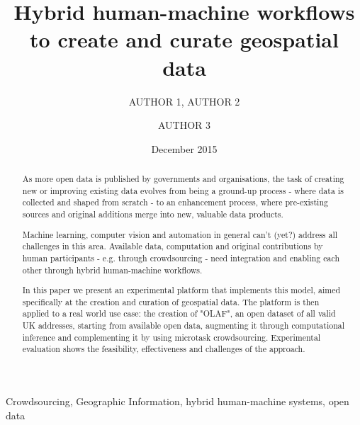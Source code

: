 \documentclass{llncs}
\title{Hybrid human-machine workflows to create and curate geospatial data}
\author{AUTHOR 1\inst{1}, AUTHOR 2\inst{1} \and AUTHOR 3\inst{2}}
\institute{INSTITUTE 1 \email{EMAIL FOR AUTHOR 1} \and INSTITUTE 2}
\date{December 2015}
\begin{document}
\maketitle

\begin{abstract}
As more open data is published by governments and organisations, the task of creating new or improving existing data evolves from being a ground-up process - where data is collected and shaped from scratch - to an enhancement process, where pre-existing sources and original additions merge into new, valuable data products. 

Machine learning, computer vision and automation in general can't (yet?) address all challenges in this area. Available data, computation and original contributions by human participants - e.g. through crowdsourcing - need integration and enabling each other through hybrid human-machine workflows. 

In this paper we present an experimental platform that implements this model, aimed specifically at the creation and curation of geospatial data. The platform is then applied to a real world use case: the creation of "OLAF", an open dataset of all valid UK addresses, starting from available open data, augmenting it through computational inference and complementing it by using microtask crowdsourcing. Experimental evaluation shows the feasibility, effectiveness and challenges of the approach.
\end{abstract}

\begin{keywords}
Crowdsourcing, Geographic Information, hybrid human-machine systems, open data 
\end{keywords}
\end{document}
